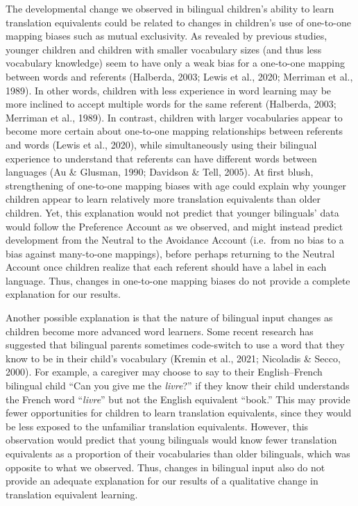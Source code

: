 \documentclass[
  english,
  ,man,floatsintext]{apa6}
\begin{document}
The developmental change we observed in bilingual children's ability to learn translation equivalents could be related to changes in children's use of one-to-one mapping biases such as mutual exclusivity. As revealed by previous studies, younger children and children with smaller vocabulary sizes (and thus less vocabulary knowledge) seem to have only a weak bias for a one-to-one mapping between words and referents (Halberda, 2003; Lewis et al., 2020; Merriman et al., 1989). In other words, children with less experience in word learning may be more inclined to accept multiple words for the same referent (Halberda, 2003; Merriman et al., 1989). In contrast, children with larger vocabularies appear to become more certain about one-to-one mapping relationships between referents and words (Lewis et al., 2020), while simultaneously using their bilingual experience to understand that referents can have different words between languages (Au \& Glusman, 1990; Davidson \& Tell, 2005). At first blush, strengthening of one-to-one mapping biases with age could explain why younger children appear to learn relatively more translation equivalents than older children. Yet, this explanation would not predict that younger bilinguals' data would follow the Preference Account as we observed, and might instead predict development from the Neutral to the Avoidance Account (i.e.~from no bias to a bias against many-to-one mappings), before perhaps returning to the Neutral Account once children realize that each referent should have a label in each language. Thus, changes in one-to-one mapping biases do not provide a complete explanation for our results.

Another possible explanation is that the nature of bilingual input changes as children become more advanced word learners. Some recent research has suggested that bilingual parents sometimes code-switch to use a word that they know to be in their child's vocabulary (Kremin et al., 2021; Nicoladis \& Secco, 2000). For example, a caregiver may choose to say to their English--French bilingual child ``Can you give me the \emph{livre}?'' if they know their child understands the French word ``\emph{livre}'' but not the English equivalent ``book.'' This may provide fewer opportunities for children to learn translation equivalents, since they would be less exposed to the unfamiliar translation equivalents. However, this observation would predict that young bilinguals would know fewer translation equivalents as a proportion of their vocabularies than older bilinguals, which was opposite to what we observed. Thus, changes in bilingual input also do not provide an adequate explanation for our results of a qualitative change in translation equivalent learning.
\end{document}
